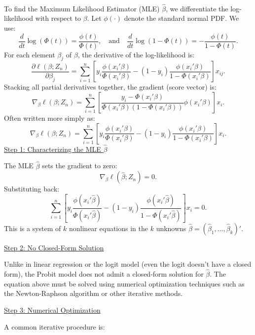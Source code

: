 \documentclass[a4paper,12pt]{article} %
\theoremstyle{nonitalic}
\newenvironment{solution}[1]
  {\renewcommand\theinnercustomsol{#1}\innercustomsol}
  {\endinnercustomsol}
\newcounter{solutionctr}[section]
\renewcommand{\thesolutionctr}{(\alph{solutionctr})}
\newenvironment{autosolution}
  {\stepcounter{solutionctr}\begin{solution}{\thesolutionctr}}
  {\end{solution}}
\begin{document}
\begin{autosolution}
    \
    
    To find the Maximum Likelihood Estimator (MLE) $\hat{\beta}$, we differentiate the log-likelihood with respect to $\beta$. Let $\phi(\cdot)$ denote the standard normal PDF. We use:
    \[
    \frac{d}{dt}\log(\Phi(t)) = \frac{\phi(t)}{\Phi(t)}, \quad \text{and} \quad \frac{d}{dt}\log(1-\Phi(t)) = -\frac{\phi(t)}{1-\Phi(t)}.
    \]
    For each element $\beta_j$ of $\beta$, the derivative of the log-likelihood is:
    \[
    \frac{\partial \ell(\beta;Z_n)}{\partial \beta_j} = \sum_{i=1}^n \left[y_i \frac{\phi(x_i'\beta)}{\Phi(x_i'\beta)} - (1-y_i)\frac{\phi(x_i'\beta)}{1-\Phi(x_i'\beta)}\right]x_{ij}.
    \]
    Stacking all partial derivatives together, the gradient (score vector) is:
    \[
    \nabla_{\beta}\ell(\beta;Z_n) = \sum_{i=1}^n \left[ \frac{y_i - \Phi(x_i'\beta)}{\Phi(x_i'\beta)(1-\Phi(x_i'\beta))} \phi(x_i'\beta) \right] x_i.
    \]
    Often written more simply as:
    \[
    \nabla_{\beta}\ell(\beta;Z_n) = \sum_{i=1}^n \left[ y_i \frac{\phi(x_i'\beta)}{\Phi(x_i'\beta)} - (1-y_i)\frac{\phi(x_i'\beta)}{1-\Phi(x_i'\beta)} \right] x_i.
    \]
    \underline{Step 1: Characterizing the MLE $\hat{\beta}$}
    
    The MLE $\hat{\beta}$ sets the gradient to zero:
    \[
    \nabla_{\beta}\ell(\hat{\beta};Z_n) = 0.
    \]
    Substituting back:
    \[
    \sum_{i=1}^n \left[ y_i \frac{\phi(x_i'\hat{\beta})}{\Phi(x_i'\hat{\beta})} - (1-y_i)\frac{\phi(x_i'\hat{\beta})}{1-\Phi(x_i'\hat{\beta})} \right] x_i = 0.
    \]
    This is a system of $k$ nonlinear equations in the $k$ unknowns $\hat{\beta} = (\hat{\beta}_1, \ldots, \hat{\beta}_k)'$.
    
    \underline{Step 2: No Closed-Form Solution}

    Unlike in linear regression or the logit model (even the logit doesn't have a closed form), the Probit model does not admit a closed-form solution for $\hat{\beta}$. The equation above must be solved using numerical optimization techniques such as the Newton-Raphson algorithm or other iterative methods.

    \underline{Step 3: Numerical Optimization}

    A common iterative procedure is:

    
    

\end{autosolution}
\end{document}
